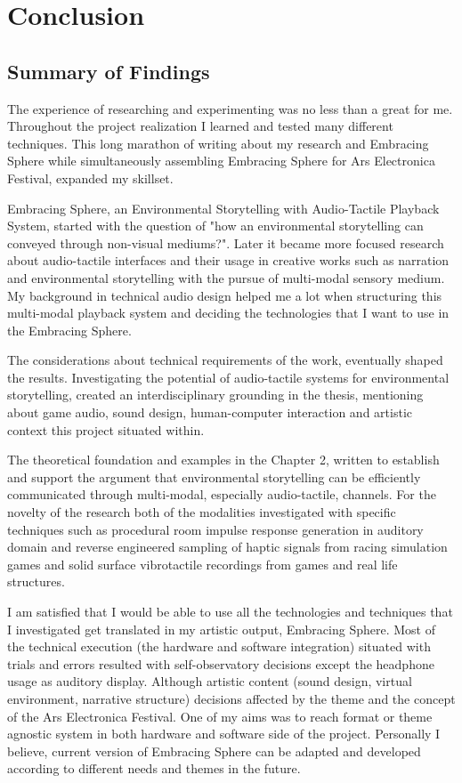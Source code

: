 \chapter{Conclusion}
    \section{Summary of Findings}
        The experience of researching and experimenting was no less than a great for me. Throughout the project realization I learned and tested many different techniques. This long marathon of writing about my research and Embracing Sphere while simultaneously assembling Embracing Sphere for Ars Electronica Festival, expanded my skillset.\par

        Embracing Sphere, an Environmental Storytelling with Audio-Tactile Playback System, started with the question of "how an environmental storytelling can conveyed through non-visual mediums?". Later it became more focused research about audio-tactile interfaces and their usage in creative works such as narration and environmental storytelling with the pursue of multi-modal sensory medium. My background in technical audio design helped me a lot when structuring this multi-modal playback system and deciding the technologies that I want to use in the Embracing Sphere.\par

        The considerations about technical requirements of the work, eventually shaped the results. Investigating the potential of audio-tactile systems for environmental storytelling, created an interdisciplinary grounding in the thesis, mentioning about game audio, sound design, human-computer interaction and artistic context this project situated within.\par

        The theoretical foundation and examples in the Chapter 2, written to establish and support the argument that environmental storytelling can be efficiently communicated through multi-modal, especially audio-tactile, channels. For the novelty of the research both of the modalities investigated with specific techniques such as procedural room impulse response generation in auditory domain and reverse engineered sampling of haptic signals from racing simulation games and solid surface vibrotactile recordings from games and real life structures.\par

        I am satisfied that I would be able to use all the technologies and techniques that I investigated get translated in my artistic output, Embracing Sphere. Most of the technical execution (the hardware and software integration) situated with trials and errors resulted with self-observatory decisions except the headphone usage as auditory display. Although artistic content (sound design, virtual environment, narrative structure) decisions affected by the theme and the concept of the Ars Electronica Festival. One of my aims was to reach format or theme agnostic system in both hardware and software side of the project. Personally I believe, current version of Embracing Sphere can be adapted and developed according to different needs and themes in the future.\par

